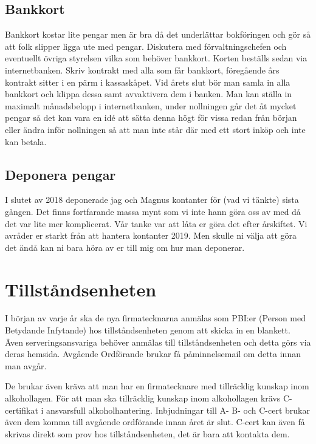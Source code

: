\documentclass[10pt]{article}
\begin{document}
    \subsection{Bankkort}
    
    Bankkort kostar lite pengar men är bra då det underlättar bokföringen och gör så att folk slipper ligga ute med pengar. Diskutera med förvaltningschefen och eventuellt övriga styrelsen vilka som behöver bankkort. Korten beställs sedan via internetbanken. Skriv kontrakt med alla som får bankkort, föregående års kontrakt sitter i en pärm i kassaskåpet. Vid årets slut bör man samla in alla bankkort och klippa dessa samt avvaktivera dem i banken. Man kan ställa in maximalt månadsbelopp i internetbanken, under nollningen går det åt mycket pengar så det kan vara en idé att sätta denna högt för vissa redan från början eller ändra inför nollningen så att man inte står där med ett stort inköp och inte kan betala.
    
    \subsection{Deponera pengar}
    
    I slutet av 2018 deponerade jag och Magnus kontanter för (vad vi tänkte) sista gången. Det finns fortfarande massa mynt som vi inte hann göra oss av med då det var lite mer komplicerat. Vår tanke var att låta er göra det efter årskiftet. Vi avråder er starkt från att hantera kontanter 2019. Men skulle ni välja att göra det ändå kan ni bara höra av er till mig om hur man deponerar.
    
    \section{Tillståndsenheten}
    
    I början av varje år ska de nya firmatecknarna anmälas som PBI:er (Person med Betydande Infytande) hos tillståndsenheten genom att skicka in en blankett. Även serveringsansvariga behöver anmälas till tillståndsenheten och detta görs via deras hemsida. Avgående Ordförande brukar få påminnelsemail om detta innan man avgår.
    
    De brukar även kräva att man har en firmatecknare med tillräcklig kunskap inom alkohollagen. För att man ska tillräcklig kunskap inom alkohollagen krävs C-certifikat i ansvarsfull alkoholhantering. Inbjudningar till A- B- och C-cert brukar även dem komma till avgående ordförande innan året är slut. C-cert kan även få skrivas direkt som prov hos tillståndsenheten, det är bara att kontakta dem.
    
\end{document}
